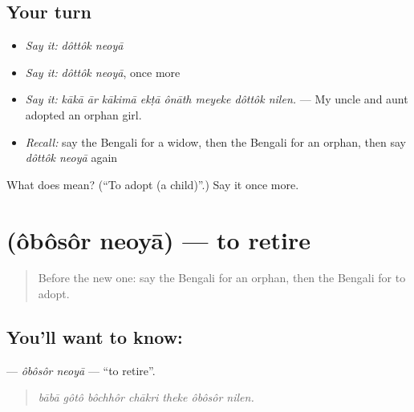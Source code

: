 \subsection*{Your turn}
\begin{itemize}
\raggedright
  \item \emph{Say it:} \emph{dôttôk neoyā}
  \item \emph{Say it:} \emph{dôttôk neoyā}, once more
  \item \emph{Say it:} \emph{kākā ār kākimā ekṭā ônāth meyeke dôttôk nilen.} — My uncle and aunt adopted an orphan girl.
  \item \emph{Recall:} say the Bengali for a widow, then the Bengali for an orphan, then say \emph{dôttôk neoyā} again
\end{itemize}

\begin{tcolorbox}[breakable,colback=teal!4,colframe=teal!35!black,title={Before you move on}]
What does   mean? (\textquotedblleft{}To adopt (a child)\textquotedblright{}.) Say it once more.
\end{tcolorbox}
\section[\texorpdfstring{\bn{অবসর} \bn{নেওয়া} (ôbôsôr neoyā)}{অবসর নেওয়া (ôbôsôr neoyā)}]{  (ôbôsôr neoyā) — to retire}

\label{lesson:BN-C490-obosor-neoya}



\begin{quote}
Before the new one: say the Bengali for an orphan, then the Bengali for to adopt.
\end{quote}

\subsection*{You'll want to know:  }
\textbf{ } — \emph{ôbôsôr neoyā} — \textquotedblleft{}to retire\textquotedblright{}.

\begin{quote}
      
\end{quote}

\begin{quote}
\emph{bābā gôtô bôchhôr chākri theke ôbôsôr nilen.}
\end{quote}

